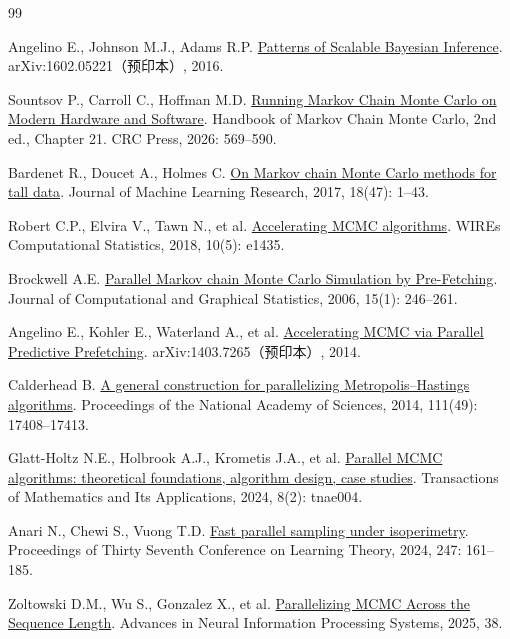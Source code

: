 \documentclass[UTF8,a4paper,zihao=-4,fontset=fandol]{ctexart}
\begin{document}
\clearpage
\begin{thebibliography}{99}\raggedright
\setlength{\itemsep}{4pt}
 Angelino E., Johnson M.J., Adams R.P.
\href{https://arxiv.org/abs/1602.05221v2}{Patterns of Scalable Bayesian Inference}.
arXiv:1602.05221（预印本）, 2016.

 Sountsov P., Carroll C., Hoffman M.D.
\href{https://doi.org/10.1201/9781003453420-21}{Running Markov Chain Monte Carlo on Modern Hardware and Software}.
Handbook of Markov Chain Monte Carlo, 2nd ed., Chapter 21. CRC Press, 2026: 569–590.

 Bardenet R., Doucet A., Holmes C.
\href{https://jmlr.org/papers/v18/15-205.html}{On Markov chain Monte Carlo methods for tall data}.
Journal of Machine Learning Research, 2017, 18(47): 1–43.

 Robert C.P., Elvira V., Tawn N., et al.
\href{https://wires.onlinelibrary.wiley.com/doi/10.1002/wics.1435}{Accelerating MCMC algorithms}.
WIREs Computational Statistics, 2018, 10(5): e1435.

 Brockwell A.E.
\href{https://doi.org/10.1198/106186006X100579}{Parallel Markov chain Monte Carlo Simulation by Pre-Fetching}.
Journal of Computational and Graphical Statistics, 2006, 15(1): 246–261.

 Angelino E., Kohler E., Waterland A., et al.
\href{https://arxiv.org/abs/1403.7265v1}{Accelerating MCMC via Parallel Predictive Prefetching}.
arXiv:1403.7265（预印本）, 2014.

 Calderhead B.
\href{https://doi.org/10.1073/pnas.1408184111}{A general construction for parallelizing Metropolis–Hastings algorithms}.
Proceedings of the National Academy of Sciences, 2014, 111(49): 17408–17413.

 Glatt-Holtz N.E., Holbrook A.J., Krometis J.A., et al.
\href{https://doi.org/10.1093/imatrm/tnae004}{Parallel MCMC algorithms: theoretical foundations, algorithm design, case studies}.
Transactions of Mathematics and Its Applications, 2024, 8(2): tnae004.

 Anari N., Chewi S., Vuong T.D.
\href{https://proceedings.mlr.press/v247/anari24a.html}{Fast parallel sampling under isoperimetry}.
Proceedings of Thirty Seventh Conference on Learning Theory, 2024, 247: 161–185.

 Zoltowski D.M., Wu S., Gonzalez X., et al.
\href{https://proceedings.nips.cc/paper\_files/paper/2025/hash/202886ee1c9ca735cb5bff3a00a69883-Abstract-Conference.html}{Parallelizing MCMC Across the Sequence Length}.
Advances in Neural Information Processing Systems, 2025, 38.


\end{thebibliography}
\end{document}
